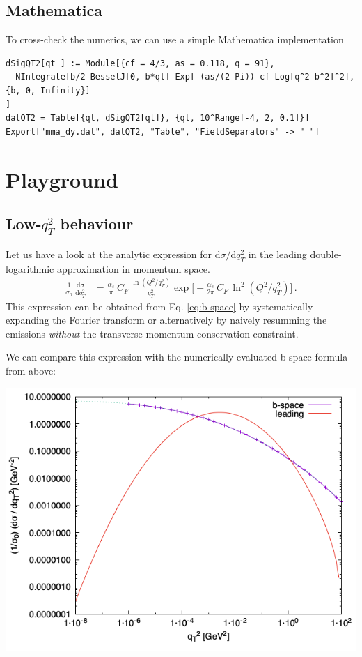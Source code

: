 \documentclass[11pt]{article}
\begin{document}
\subsection{Mathematica}
\label{sec:orga513846}
To cross-check the numerics, we can use a simple Mathematica implementation
\begin{verbatim}
dSigQT2[qt_] := Module[{cf = 4/3, as = 0.118, q = 91},
  NIntegrate[b/2 BesselJ[0, b*qt] Exp[-(as/(2 Pi)) cf Log[q^2 b^2]^2], {b, 0, Infinity}]
]
datQT2 = Table[{qt, dSigQT2[qt]}, {qt, 10^Range[-4, 2, 0.1]}]
Export["mma_dy.dat", datQT2, "Table", "FieldSeparators" -> " "]
\end{verbatim}
\section{Playground}
\label{sec:org9e6b498}

\subsection{Low-\(q_T^2\) behaviour}
\label{sec:org5485da5}
Let us have a look at the analytic expression for \(\mathrm{d}\sigma/\mathrm{d}q_T^2\) in the leading double-logarithmic approximation in momentum space.
\begin{align}
  \frac{1}{\sigma_0}\,\frac{\mathrm{d}\sigma}{\mathrm{d}q_T^2}
  &=
  \frac{\alpha_s}{\pi}\, C_F \, \frac{\ln(Q^2 / q_T^2)}{q_T^2}
  \exp\Big[
    -\frac{\alpha_s}{2\pi}\, C_F \, \ln^2(Q^2 / q_T^2)
  \Big]
  \,.
\end{align}
This expression can be obtained from Eq. \eqref{eq:b-space} by systematically expanding the Fourier transform or alternatively by naively resumming the emissions \emph{without} the transverse momentum conservation constraint.

We can compare this expression with the numerically evaluated b-space formula from above:
\begin{center}
\includegraphics[width=.9\linewidth]{plot_QT2.png}
\label{}
\end{center}
\end{document}
